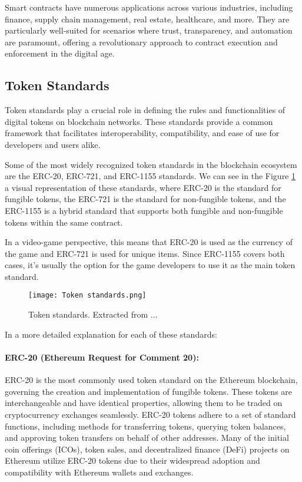 Smart contracts have numerous applications across various industries, including
finance, supply chain management, real estate, healthcare, and more. They are
particularly well-suited for scenarios where trust, transparency, and
automation are paramount, offering a revolutionary approach to contract
execution and enforcement in the digital age.

\subsection{Token Standards}
\label{subsec:token_standards}

Token standards play a crucial role in defining the rules and functionalities
of digital tokens on blockchain networks. These standards provide a common
framework that facilitates interoperability, compatibility, and ease of use for
developers and users alike.

Some of the most widely recognized token standards in the blockchain ecosystem
are the ERC-20, ERC-721, and ERC-1155 standards. We can see in the Figure
\ref{fig:token_standards} a visual representation of these standards, where
ERC-20 is the standard for fungible tokens, the ERC-721 is the standard for
non-fungible tokens, and the ERC-1155 is a hybrid standard that supports both
fungible and non-fungible tokens within the same contract.

In a video-game perspective, this means that ERC-20 is used as the currency of
the game and ERC-721 is used for unique items. Since ERC-1155 covers both
cases, it's usually the option for the game developers to use it as the main
token standard.

\begin{figure}[H]
    \texttt{[image: Token standards.png]}
    \centering
    \caption[Token standards]{Token standards. Extracted from ...}
    \label{fig:token_standards}
\end{figure}

In a more detailed explanation for each of these standards:

\paragraph{ERC-20 (Ethereum Request for Comment 20):}
ERC-20 is the most commonly used token standard on the Ethereum blockchain,
governing the creation and implementation of fungible tokens. These tokens are
interchangeable and have identical properties, allowing them to be traded on
cryptocurrency exchanges seamlessly. ERC-20 tokens adhere to a set of standard
functions, including methods for transferring tokens, querying token balances,
and approving token transfers on behalf of other addresses. Many of the initial
coin offerings (ICOs), token sales, and decentralized finance (DeFi) projects
on Ethereum utilize ERC-20 tokens due to their widespread adoption and
compatibility with Ethereum wallets and exchanges.

